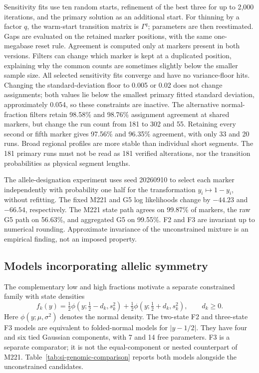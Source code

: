 \documentclass[11pt]{article}
\begin{document}
Sensitivity fits use ten random starts, refinement of the best three for up
to 2,000 iterations, and the primary solution as an additional start. For
thinning by a factor $q$, the warm-start transition matrix is $\Gamma^q$;
parameters are then reestimated. Gaps are evaluated on the retained marker
positions, with the same one-megabase reset rule. Agreement is computed only
at markers present in both versions. Filters can change which marker is kept
at a duplicated position, explaining why the common counts are sometimes
slightly below the smaller sample size. All selected sensitivity fits
converge and have no variance-floor hits. Changing the standard-deviation floor to 0.005 or 0.02 does not change
assignments; both values lie below the smallest primary fitted standard
deviation, approximately 0.054, so these constraints are inactive.
The alternative normal-fraction filters retain 98.58\% and 98.76\%
assignment agreement at shared markers, but change the run count from 181
to 302 and 55. Retaining every second or fifth marker gives 97.56\% and
96.35\% agreement, with only 33 and 20 runs. Broad regional profiles are
more stable than individual short segments. The 181 primary runs must not
be read as 181 verified alterations, nor the transition probabilities as
physical segment lengths.

The allele-designation experiment uses seed 20260910 to select each
marker independently with probability one half for the transformation $y_i\mapsto1-y_i$, without
refitting. The fixed M221 and G5 log likelihoods change by $-44.23$ and
$-66.54$, respectively. The M221 state path agrees on 99.87\% of markers,
the raw G5 path on 56.63\%, and aggregated G5 on 99.55\%. F2 and F3 are
invariant up to numerical rounding. Approximate invariance of the unconstrained
mixture is an empirical finding, not an imposed property.

\subsection{Models incorporating allelic symmetry}\label{sec:si-genomic-symmetry}

The complementary low and high fractions motivate a separate constrained
family with state densities
\[
 f_k(y)=\tfrac12\phi(y;\tfrac12-d_k,s_k^2)
       +\tfrac12\phi(y;\tfrac12+d_k,s_k^2),\qquad d_k\geq0.
\]
Here $\phi(y;\mu,\sigma^2)$ denotes the normal density. The two-state F2
and three-state F3 models are equivalent to folded-normal models for
$|y-1/2|$. They have four and six tied Gaussian components, with 7 and 14
free parameters. F3 is a separate comparator; it is not the equal-component
or nested counterpart of M221. Table~\ref{tab:si-genomic-comparison}
reports both models alongside the unconstrained candidates.
\end{document}
